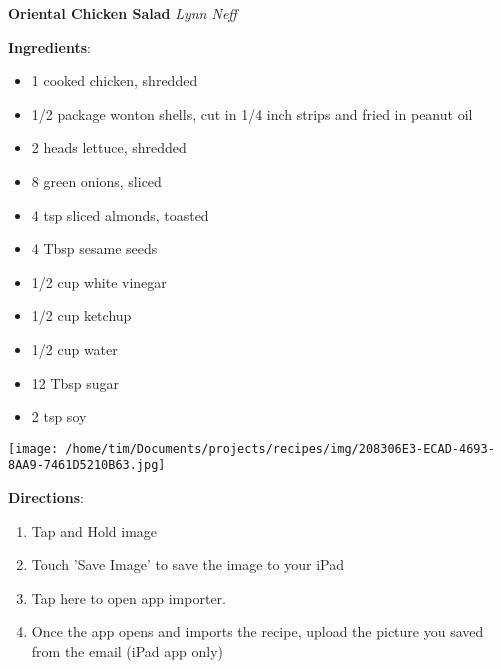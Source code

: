 \documentclass[11pt, twoside, openany]{book}
\begin{document}
\noindent\begin{minipage}[t]{\linewidth}%
{\Large\textbf{Oriental Chicken Salad}} \label{oriental-chicken-salad}\hfill\textit{Lynn Neff}\\
\noindent\begin{minipage}[t]{0.78\linewidth}%
\textbf{Ingredients}:\vspace{-3mm}
\begin{multicols}{2}
\begin{itemize}\setlength\itemsep{-1mm}
\item 1 cooked chicken, shredded
\item 1/2 package wonton shells, cut in 1/4 inch strips and fried in peanut oil
\item 2 heads lettuce, shredded
\item 8 green onions, sliced
\item 4 tsp sliced almonds, toasted
\item 4 Tbsp sesame seeds
\item 1/2 cup white vinegar
\item 1/2 cup ketchup
\item 1/2 cup water
\item 12 Tbsp sugar
\item 2 tsp soy
\end{itemize}
\end{multicols}
\end{minipage}
\noindent\begin{minipage}[t]{0.18\linewidth}
\centering \strut\vspace*{-\baselineskip}\newline
\texttt{[image: /home/tim/Documents/projects/recipes/img/208306E3-ECAD-4693-8AA9-7461D5210B63.jpg]}\\
\end{minipage}\vspace{3mm}
\textbf{Directions}:
\vspace{-3mm}\begin{enumerate}\setlength\itemsep{-1mm}
\item Tap and Hold image
\item Touch 'Save Image' to save the image to your iPad
\item Tap here to open app importer.
\item Once the app opens and imports the recipe, upload the picture you saved from the email (iPad app only)
\end{enumerate}
\end{minipage}\vspace{8mm}
\end{document}
